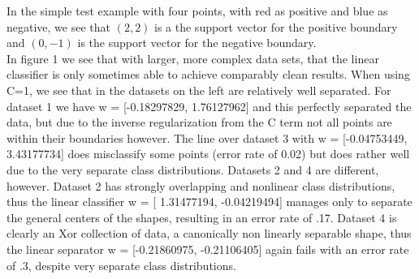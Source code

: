 \documentclass{article}
\begin{document}
In the simple test example with four points, with red as positive and blue as negative, we see that $(2, 2)$ is a the support vector for the positive boundary and $(0, -1)$ is the support vector for the negative boundary. \\
In figure 1 we see that with larger, more complex data sets, that the linear classifier is only sometimes able to achieve comparably clean results. When using C=1, we see that in the datasets on the left are relatively well separated. For dataset 1 we have w = [-0.18297829,  1.76127962] and this perfectly separated the data, but due to the inverse regularization from the C term not all points are within their boundaries however. The line over dataset 3 with w = [-0.04753449,  3.43177734] does misclassify some points (error rate of 0.02) but does rather well due to the very separate class distributions. Datasets 2 and 4 are different, however. Dataset 2 has strongly overlapping and nonlinear class distributions, thus the linear classifier w = [ 1.31477194, -0.04219494] manages only to separate the general centers of the shapes, resulting in an error rate of .17. Dataset 4 is clearly an Xor collection of data, a canonically non linearly separable shape, thus the linear separator w = [-0.21860975, -0.21106405] again fails with an error rate of .3, despite very separate class distributions.\\
\end{document}

